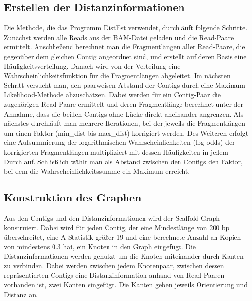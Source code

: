 \documentclass[a4paper,10pt,parskip]{scrartcl}
\begin{document}
\subsection{Erstellen der Distanzinformationen}
Die Methode, die das Programm DistEst verwendet, durchläuft folgende
Schritte. Zunächst werden alle Reads aus der BAM-Datei geladen und
die Read-Paare ermittelt. Anschließend berechnet man die Fragmentlängen
aller Read-Paare, die gegenüber dem gleichen Contig angeordnet sind,
und erstellt auf deren Basis eine Häufigkeitsverteilung.
Danach wird von der Verteilung eine Wahrscheinlichkeitsfunktion für die
Fragmentlängen abgeleitet. Im nächsten Schritt versucht man, den paarweisen
Abstand der Contigs durch eine Maximum-Likelihood-Methode abzuschätzen.
Dabei werden für ein Contig-Paar die zugehörigen Read-Paare ermittelt und
deren Fragmentlänge berechnet unter der Annahme, dass die beiden Contigs
ohne Lücke direkt aneinander angrenzen. Als nächstes durchläuft man mehrere
Iterationen, bei der jeweils die Fragmentlängen um einen Faktor (min\_dist
bis max\_dist) korrigiert werden. Des Weiteren erfolgt eine Aufsummierung
der logarithmischen Wahrscheinlichkeiten (log odds) der korrigierten
Fragmentlängen multipliziert mit dessen Häufigkeiten in jedem Durchlauf.
Schließlich wählt man als Abstand zwischen den Contigs den Faktor, bei
dem die Wahrscheinlichkeitssumme ein Maximum erreicht.

\subsection{Konstruktion des Graphen}
Aus den Contigs und den Distanzinformationen wird der Scaffold-Graph
konstruiert. Dabei wird für jeden Contig, der eine Mindestlänge von
200 bp überschreitet, eine A-Statistik größer 19 und eine berechnete
Anzahl an Kopien von mindestens \num{0.3} hat, ein Knoten in den Graph
eingefügt. Die Distanzinformationen werden genutzt um die Knoten
miteinander durch Kanten zu verbinden. Dabei werden zwischen jedem
Knotenpaar, zwischen dessen repräsentierten Contigs eine
Distanzinformation anhand von Read-Paaren vorhanden ist, zwei Kanten
eingefügt. Die Kanten geben jeweils Orientierung und Distanz an.
\end{document}
